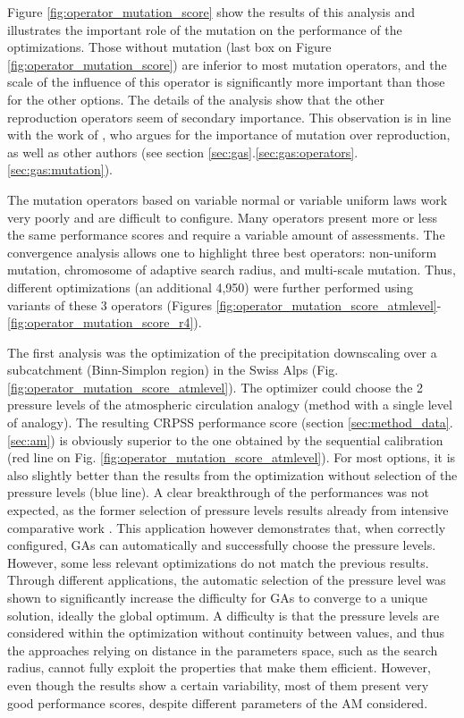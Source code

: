 \documentclass{ametsoc}
\begin{document}
Figure \ref{fig:operator_mutation_score} show the results of this analysis and illustrates the important role of the mutation on the performance of the optimizations. Those without mutation (last box on Figure \ref{fig:operator_mutation_score}) are inferior to most mutation operators, and the scale of the influence of this operator is significantly more important than those for the other options. The details of the analysis \citep[see][]{Horton2012a} show that the other reproduction operators seem of secondary importance. This observation is in line with the work of \citet{Back1996a}, who argues for the importance of mutation over reproduction, as well as other authors (see section \ref{sec:gas}.\ref{sec:gas:operators}.\ref{sec:gas:mutation}).

The mutation operators based on variable normal or variable uniform laws work very poorly and are difficult to configure. Many operators present more or less the same performance scores and require a variable amount of assessments. The convergence analysis \citep[see][]{Horton2012a} allows one to highlight three best operators: non-uniform mutation, chromosome of adaptive search radius, and multi-scale mutation. Thus, different optimizations (an additional 4,950) were further performed using variants of these 3 operators (Figures \ref{fig:operator_mutation_score_atmlevel}-\ref{fig:operator_mutation_score_r4}).

The first analysis was the optimization of the precipitation downscaling over a subcatchment (Binn-Simplon region) in the Swiss Alps (Fig. \ref{fig:operator_mutation_score_atmlevel}). The optimizer could choose the 2 pressure levels of the atmospheric circulation analogy (method with a single level of analogy). The resulting CRPSS performance score (section \ref{sec:method_data}.\ref{sec:am}) is obviously superior to the one obtained by the sequential calibration (red line on Fig. \ref{fig:operator_mutation_score_atmlevel}). For most options, it is also slightly better than the results from the optimization without selection of the pressure levels (blue line). A clear breakthrough of the performances was not expected, as the former selection of pressure levels results already from intensive comparative work \citep{Bontron2004}. This application however demonstrates that, when correctly configured, GAs can automatically and successfully choose the pressure levels. However, some less relevant optimizations do not match the previous results. Through different applications, the automatic selection of the pressure level was shown to significantly increase the difficulty for GAs to converge to a unique solution, ideally the global optimum. A difficulty is that the pressure levels are considered within the optimization without continuity between values, and thus the approaches relying on distance in the parameters space, such as the search radius, cannot fully exploit the properties that make them efficient. However, even though the results show a certain variability, most of them present very good performance scores, despite different parameters of the AM considered.
\end{document}
